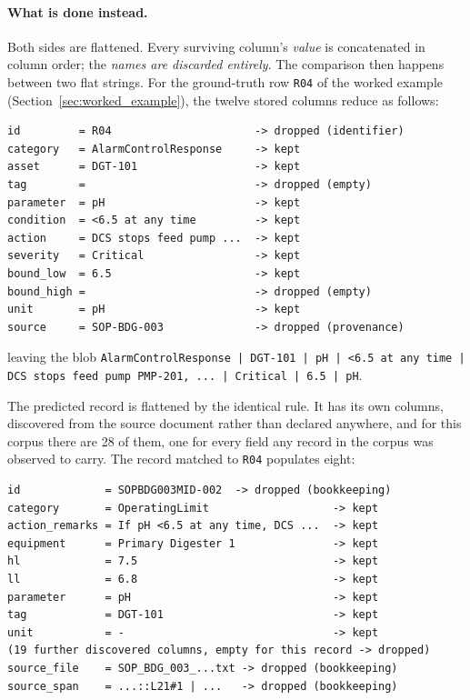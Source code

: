 \documentclass[11pt]{article}
\begin{document}
\paragraph{What is done instead.} Both sides are flattened. Every surviving
column's \emph{value} is concatenated in column order; the \emph{names are
discarded entirely}. The comparison then happens between two flat strings. For
the ground-truth row \texttt{R04} of the worked example
(Section~\ref{sec:worked_example}), the twelve stored columns reduce as follows:

\begin{lstlisting}
id         = R04                      -> dropped (identifier)
category   = AlarmControlResponse     -> kept
asset      = DGT-101                  -> kept
tag        =                          -> dropped (empty)
parameter  = pH                       -> kept
condition  = <6.5 at any time         -> kept
action     = DCS stops feed pump ...  -> kept
severity   = Critical                 -> kept
bound_low  = 6.5                      -> kept
bound_high =                          -> dropped (empty)
unit       = pH                       -> kept
source     = SOP-BDG-003              -> dropped (provenance)
\end{lstlisting}

leaving the blob \texttt{AlarmControlResponse | DGT-101 | pH | <6.5 at any time |
DCS stops feed pump PMP-201, ... | Critical | 6.5 | pH}.

The predicted record is flattened by the identical rule. It has its own columns,
discovered from the source document rather than declared anywhere, and for this
corpus there are 28 of them, one for every field any record in the corpus was
observed to carry. The record matched to \texttt{R04} populates eight:

\begin{lstlisting}
id             = SOPBDG003MID-002  -> dropped (bookkeeping)
category       = OperatingLimit                   -> kept
action_remarks = If pH <6.5 at any time, DCS ...  -> kept
equipment      = Primary Digester 1               -> kept
hl             = 7.5                              -> kept
ll             = 6.8                              -> kept
parameter      = pH                               -> kept
tag            = DGT-101                          -> kept
unit           = -                                -> kept
(19 further discovered columns, empty for this record -> dropped)
source_file    = SOP_BDG_003_...txt -> dropped (bookkeeping)
source_span    = ...::L21#1 | ...   -> dropped (bookkeeping)
\end{lstlisting}
\end{document}
